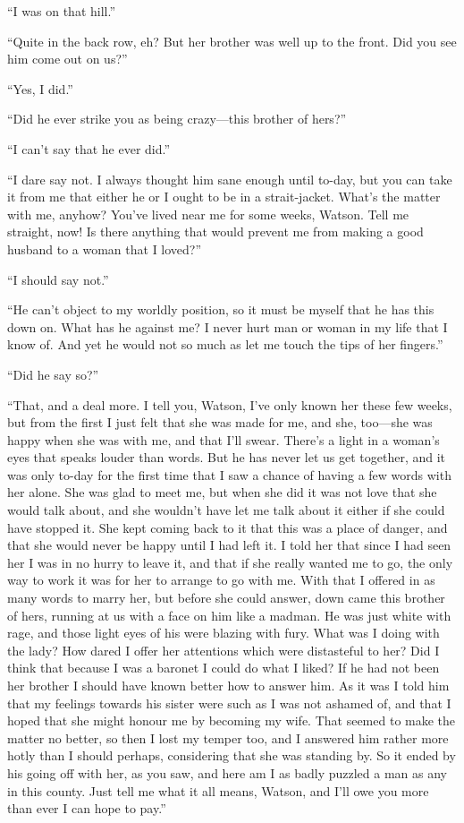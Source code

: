 \documentclass[paper=a5,BCOR=7mm,twoside,DIV=calc,12pt,usegeometry,openany,chapterprefix,endperiod,headings=big]{scrbook} %
\begin{document}
\enquote{I was on that hill.}

\enquote{Quite in the back row, eh? But her brother was well up to the front. Did you see him come out on us?}

\enquote{Yes, I did.}

\enquote{Did he ever strike you as being crazy---this brother of hers?}

\enquote{I can't say that he ever did.}

\enquote{I dare say not. I always thought him sane enough until to-day, but you can take it from me that either he or I ought to be in a strait-jacket. What's the matter with me, anyhow? You've lived near me for some weeks, Watson. Tell me straight, now! Is there anything that would prevent me from making a good husband to a woman that I loved?}

\enquote{I should say not.}

\enquote{He can't object to my worldly position, so it must be myself that he has this down on. What has he against me? I never hurt man or woman in my life that I know of. And yet he would not so much as let me touch the tips of her fingers.}

\enquote{Did he say so?}

\enquote{That, and a deal more. I tell you, Watson, I've only known her these few weeks, but from the first I just felt that she was made for me, and she, too---she was happy when she was with me, and that I'll swear. There's a light in a woman's eyes that speaks louder than words. But he has never let us get together, and it was only to-day for the first time that I saw a chance of having a few words with her alone. She was glad to meet me, but when she did it was not love that she would talk about, and she wouldn't have let me talk about it either if she could have stopped it. She kept coming back to it that this was a place of danger, and that she would never be happy until I had left it. I told her that since I had seen her I was in no hurry to leave it, and that if she really wanted me to go, the only way to work it was for her to arrange to go with me. With that I offered in as many words to marry her, but before she could answer, down came this brother of hers, running at us with a face on him like a madman. He was just white with rage, and those light eyes of his were blazing with fury. What was I doing with the lady? How dared I offer her attentions which were distasteful to her? Did I think that because I was a baronet I could do what I liked? If he had not been her brother I should have known better how to answer him. As it was I told him that my feelings towards his sister were such as I was not ashamed of, and that I hoped that she might honour me by becoming my wife. That seemed to make the matter no better, so then I lost my temper too, and I answered him rather more hotly than I should perhaps, considering that she was standing by. So it ended by his going off with her, as you saw, and here am I as badly puzzled a man as any in this county. Just tell me what it all means, Watson, and I'll owe you more than ever I can hope to pay.}
\end{document}
